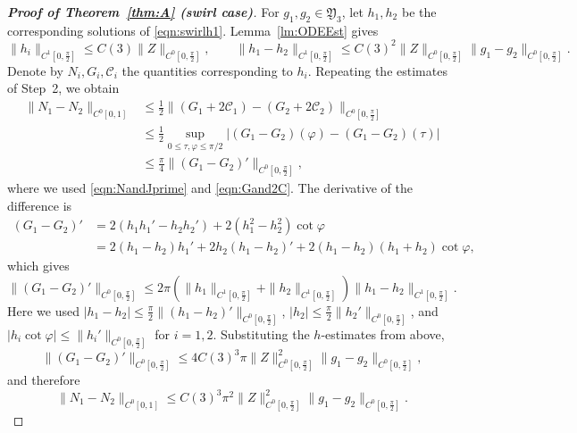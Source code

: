 \documentclass{amsart}
\newcommand{\mcC}{\mathcal{C}}
\begin{document}
\begin{proof}[\textbf{Proof of Theorem~\ref{thm:A} (swirl case)}]
For $g_1,g_2\in\mathfrak{Y}_3$, let $h_1,h_2$ be the corresponding solutions of \eqref{eqn:swirlh1}. Lemma~\ref{lm:ODEEst} gives
\[
\|h_i\|_{C^1[0,\frac{\pi}{2}]}\le C(3)\|Z\|_{C^0[0,\frac{\pi}{2}]},\qquad
\|h_1-h_2\|_{C^1[0,\frac{\pi}{2}]}\le C(3)^2\|Z\|_{C^0[0,\frac{\pi}{2}]}\|g_1-g_2\|_{C^0[0,\frac{\pi}{2}]}.
\]
Denote by $N_i, G_i,\mcC_i$ the quantities corresponding to $h_i$.
Repeating the estimates of Step~2, we obtain
\begin{align*}
\|N_1-N_2\|_{C^0[0,1]} 
&\le \frac12 \|(G_1+2\mcC_1)-(G_2+2\mcC_2)\|_{C^0[0,\frac{\pi}{2}]}\\
&\le \frac12 \sup_{0\le\tau,\varphi\le\pi/2} |(G_1-G_2)(\varphi)-(G_1-G_2)(\tau)|\\
&\le \frac{\pi}{4} \|(G_1-G_2)'\|_{C^0[0,\frac{\pi}{2}]},
\end{align*}
where we used \eqref{eqn:NandJprime} and \eqref{eqn:Gand2C}.
The derivative of the difference is
\begin{align*}
(G_1-G_2)' &= 2(h_1h_1'-h_2h_2') + 2(h_1^2-h_2^2)\cot\varphi\\
&=2(h_1-h_2)h_1'+ 2 h_2(h_1-h_2)' + 2(h_1-h_2) (h_1+h_2)\cot\varphi,
\end{align*}
which gives
\[
\|(G_1-G_2)'\|_{C^0[0,\frac{\pi}{2}]}\le 2\pi(\|h_1\|_{C^1[0,\frac{\pi}{2}]}+\|h_2\|_{C^1[0,\frac{\pi}{2}]})\|h_1-h_2\|_{C^1[0,\frac{\pi}{2}]}.
\]
Here we used $|h_1-h_2| \le \frac{\pi}{2} \|(h_1-h_2)'\|_{C^0[0,\frac{\pi}{2}]}$, $|h_2| \le \frac{\pi}{2} \|h_2'\|_{C^0[0,\frac{\pi}{2}]}$, and $|h_i\cot\varphi|\le \|h_i'\|_{C^0[0,\frac{\pi}{2}]}$ for $i=1,2$.
Substituting the $h$-estimates from above,
\[
\|(G_1-G_2)'\|_{C^0[0,\frac{\pi}{2}]}\le 4 C(3)^3 \pi \|Z\|_{C^0[0,\frac{\pi}{2}]}^2\|g_1-g_2\|_{C^0[0,\frac{\pi}{2}]},
\]
and therefore
\[
\|N_1-N_2\|_{C^0[0,1]}
\le C(3)^3  \pi^2 \|Z\|_{C^0[0,\frac{\pi}{2}]}^2\|g_1-g_2\|_{C^0[0,\frac{\pi}{2}]}.
\]


\end{proof}
\end{document}
